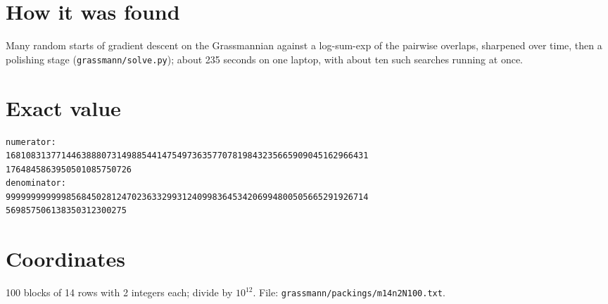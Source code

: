\documentclass[11pt,a4paper]{article}
\begin{document}
\section{How it was found}
Many random starts of gradient descent on the Grassmannian against a log-sum-exp of the pairwise overlaps, sharpened over time, then a polishing stage (\texttt{grassmann/solve.py}); about 235 seconds on one laptop, with about ten such searches running at once.


\appendix
\section{Exact value}
{\small
\begin{verbatim}
numerator:
168108313771446388807314988544147549736357707819843235665909045162966431
1764845863950501085750726
denominator:
999999999999856845028124702363329931240998364534206994800505665291926714
569857506138350312300275
\end{verbatim}}

\section{Coordinates}
100 blocks of 14 rows with 2 integers each; divide by $10^{12}$. File: \texttt{grassmann/packings/m14n2N100.txt}.
{\tiny
\begin{multicols}{4}
\end{multicols}}
\end{document}

